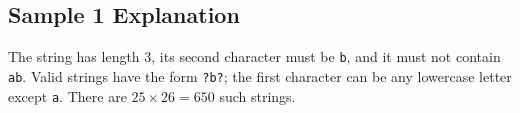 \subsection{Sample 1 Explanation}

The string has length $3$, its second character must be \texttt{b}, and it must not contain \texttt{ab}. Valid strings have the form \texttt{?b?}; the first character can be any lowercase letter except \texttt{a}. There are $25 \times 26 = 650$ such strings.

